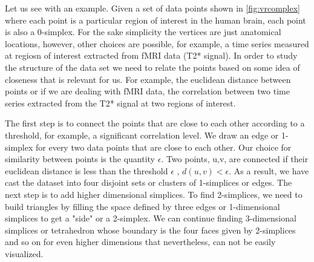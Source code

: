 \documentclass[onecollarge,runningheads]{svjour2}
\begin{document}

Let us see with an example. Given a set of data points shown in \ref{fig:vrcomplex} where each point is a particular region of interest in the human brain, each point is also a 0-simplex. For the sake simplicity the vertices are just anatomical locations, however, other choices are possible, for example, a time series measured at regiosn of interest extracted from fMRI data (T2* signal).
In order to study the structure of the data set we need to relate the points based on some idea of closeness that is relevant for us. For example, the euclidean distance between points or if we are dealing with fMRI data, the correlation between two time series extracted from the T2* signal at two regions of interest.

The first step is to connect the points that are close to each other according to a threshold, for example, a significant correlation level. We draw an edge or 1-simplex for every two data points that are close to each other. Our choice for similarity between points is the quantity $\epsilon$. Two points, u,v, are connected if their euclidean distance is less than the threshold $\epsilon$ , $d(u,v) < \epsilon$. 
As a result, we have cast the dataset into four disjoint sets or clusters of 1-simplices or edges. The next step is to add higher dimensional simplices. To find 2-simplices, we need to build triangles by filling the space defined by three edges or 1-dimensional simplices to get a "side" or a 2-simplex. We can continue finding 3-dimensional simplices or tetrahedron whose boundary is the four faces given by 2-simplices and so on for even higher dimensions that nevertheless, can not be easily visualized. 
\end{document}
